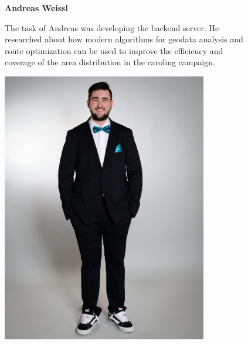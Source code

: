     \begin{figure}[H]
        \centering
        \begin{minipage}{0.6\textwidth}
          \setlength{\baselineskip}{1.5em}
          \vspace{-1em}
          \textbf{Andreas Weissl}

          The task of Andreas was developing the backend server. He researched about how modern algorithms for geodata analysis and route optimization can be used to improve the efficiency and coverage of the area distribution in the caroling campaign.
        \end{minipage}
        \hfill
        \begin{minipage}{0.35\textwidth}
            \center
            \includegraphics[width=0.8\textwidth]{images/people/andreasWeissl.jpeg}
    \end{minipage}
    \end{figure}

\newpage